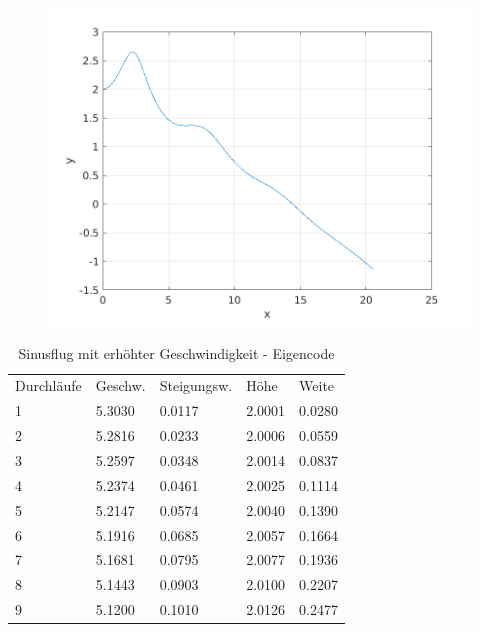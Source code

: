 \documentclass[a4paper,12pt]{scrartcl}
\begin{document}
\begin{figure}[htp]
	\centering
	\includegraphics{flightpath3.png}
	\label{fig:sin2}
\end{figure}
\begin{table}
\centering
\caption{Sinusflug mit erhöhter Geschwindigkeit - Eigencode}
\begin{tabular}{lllll}
Durchläufe & Geschw. & Steigungsw. & Höhe   & Weite    \\
1          & 5.3030  & 0.0117      & 2.0001 & 0.0280   \\
2          & 5.2816  & 0.0233      & 2.0006 & 0.0559   \\
3          & 5.2597  & 0.0348      & 2.0014 & 0.0837  \\
4          & 5.2374  & 0.0461      & 2.0025 & 0.1114   \\
5          & 5.2147  & 0.0574      & 2.0040 & 0.1390   \\
6          & 5.1916  & 0.0685      & 2.0057 & 0.1664   \\
7          & 5.1681  & 0.0795      & 2.0077 & 0.1936   \\
8          & 5.1443  & 0.0903      & 2.0100 & 0.2207   \\
9          & 5.1200  & 0.1010      & 2.0126 & 0.2477  
\end{tabular}
\end{table}
\end{document}
